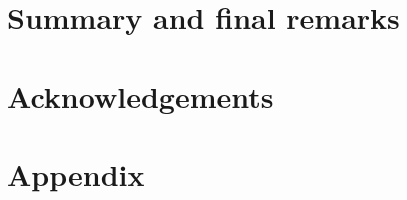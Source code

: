 \documentclass[12pt,a4paper,english]{article}
\begin{document}



\section{Summary and final remarks}



\clearpage
\section*{\hspace{17mm}Acknowledgements}


\clearpage
\section*{\hspace{17mm}Appendix}






\clearpage
\pagebreak

%

\clearpage
\pagebreak
 
\end{document}
